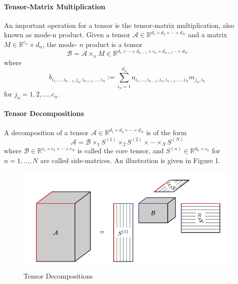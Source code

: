 \documentclass[english]{article}
\newcommand{\<}{\langle}
\renewcommand{\>}{\rangle}
\theoremstyle{definition}
\begin{document}
\paragraph{Tensor-Matrix Multiplication} An important operation for a tensor is the tensor-matrix multiplication, also known as mode-n product. Given a tensor $ \mathcal{A} \in \mathbb{R}^{d_{1} \times d_{2} \times \cdots \times d_{N}} $ and a matrix $ M \in   \mathbb{R}^{c_{n}} \times d_{n}$,  the mode-  $n $ product is a tensor
$$ \mathcal{B}=\mathcal{A} \times_{n} M \in \mathbb{R}^{d_{1} \times \cdots \times d_{n-1} \times c_{n} \times d_{n+1} \cdots \times d_{N}} $$
where $$
b_{i_{1}, \ldots, i_{n-1}, j_{n}, i_{n+1}, \ldots, i_{N}}:=\sum_{i_{n}=1}^{d_{n}} a_{i_{1}, \ldots, i_{n-1}, i_{n}, i_{n+1}, \ldots, i_{N}} m_{j_{n}, i_{n}} $$
for $ j_{n}=1,2, \ldots, c_{n} $.
\paragraph{Tensor Decompositions} A decomposition of a tensor $ \mathcal{A} \in \mathbb{R}^{d_{1} \times d_{2} \times \cdots \times d_{N}} $ is of the form
$$
\mathcal{A}=\mathcal{B} \times_{1} S^{(1)} \times_{2} S^{(2)} \times \cdots \times_{N} S^{(N)} $$
where $ \mathcal{B} \in \mathbb{R}^{c_{1} \times c_{2} \times \cdots \times c_{N}} $ is called the core tensor, and $ S^{(n)} \in \mathbb{R}^{d_{n} \times c_{n}} $ for $ n=1, \ldots, N $ are called side-matrices. An illustration is given in Figure 1.
\begin{figure}[!h]
	\centering
	\includegraphics[scale=0.6]{decomposition}
	\caption{Tensor Decompositions}
\end{figure}
\end{document}
